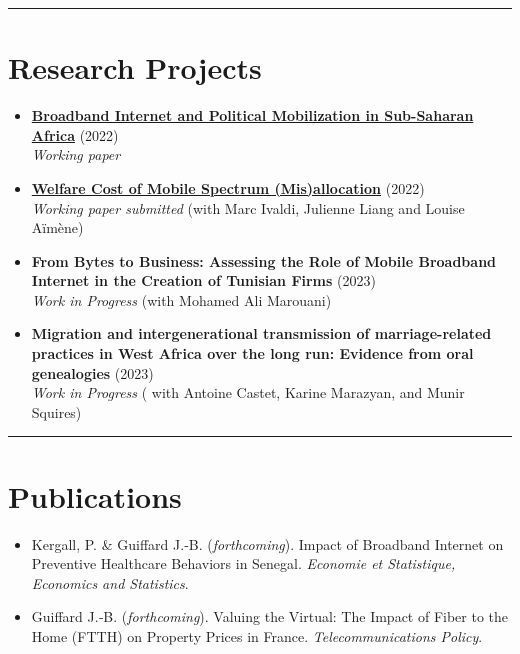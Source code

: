 \documentclass[
]{article}
\begin{document}
\begin{center}\rule{0.5\linewidth}{0.5pt}\end{center}

\section{Research Projects}\label{research-projects}

\begin{itemize}
\item
  \href{https://papers.ssrn.com/sol3/papers.cfm?abstract_id=4247083}{\textbf{Broadband
  Internet and Political Mobilization in Sub-Saharan Africa}} (2022)\\
  \emph{Working paper}
\item
  \href{https://cepr.org/publications/dp18016}{\textbf{Welfare Cost of
  Mobile Spectrum (Mis)allocation}} (2022)\\
  \emph{Working paper submitted} (with Marc Ivaldi, Julienne Liang and
  Louise Aïmène)
\item
  \textbf{From Bytes to Business: Assessing the Role of Mobile Broadband
  Internet in the Creation of Tunisian Firms} (2023)\\
  \emph{Work in Progress} (with Mohamed Ali Marouani)
\item
  \textbf{Migration and intergenerational transmission of
  marriage-related practices in West Africa over the long run: Evidence
  from oral genealogies} (2023)\\
  \emph{Work in Progress} ( with Antoine Castet, Karine Marazyan, and
  Munir Squires)
\end{itemize}

\begin{center}\rule{0.5\linewidth}{0.5pt}\end{center}

\section{Publications}\label{publications}

\begin{itemize}
\item
  Kergall, P. \& Guiffard J.‐B. (\emph{forthcoming}). Impact of
  Broadband Internet on Preventive Healthcare Behaviors in Senegal.
  \emph{Economie et Statistique, Economics and Statistics}.
\item
  Guiffard J.‐B. (\emph{forthcoming}). Valuing the Virtual: The Impact
  of Fiber to the Home (FTTH) on Property Prices in France.
  \emph{Telecommunications Policy}.
\end{itemize}
\end{document}
